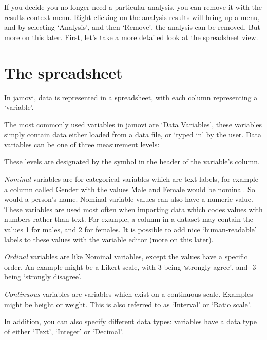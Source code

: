 If you decide you no longer need a particular analysis, you can remove it with the results context menu. Right-clicking on the analysis results will bring up a menu, and by selecting ‘Analysis’, and then ‘Remove’, the analysis can be removed. But more on this later. First, let's take a more detailed look at the spreadsheet view.


\section{The spreadsheet\label{sec:spreadsheet}}

In jamovi, data is represented in a spreadsheet, with each column representing a ‘variable’.


The most commonly used variables in jamovi are ‘Data Variables’, these variables simply contain data either loaded from a data file, or ‘typed in’ by the user. Data variables can be one of three measurement levels:

\begin{figure}[h]
\end{figure}

These levels are designated by the symbol in the header of the variable’s column.

{\it Nominal} variables are for categorical variables which are text labels, for example a column called Gender with the values Male and Female would be nominal. So would a person’s name. Nominal variable values can also have a numeric value. These variables are used most often when importing data which codes values with numbers rather than text. For example, a column in a dataset may contain the values 1 for males, and 2 for females. It is possible to add nice ‘human-readable’ labels to these values with the variable editor (more on this later).

{\it Ordinal} variables are like Nominal variables, except the values have a specific order. An example might be a Likert scale, with 3 being ‘strongly agree’, and -3 being ‘strongly disagree’.

{\it Continuous} variables are variables which exist on a continuous scale. Examples might be height or weight. This is also referred to as ‘Interval’ or ‘Ratio scale’.

In addition, you can also specify different data types: variables have a data type of either ‘Text’, ‘Integer’ or ‘Decimal’. 

